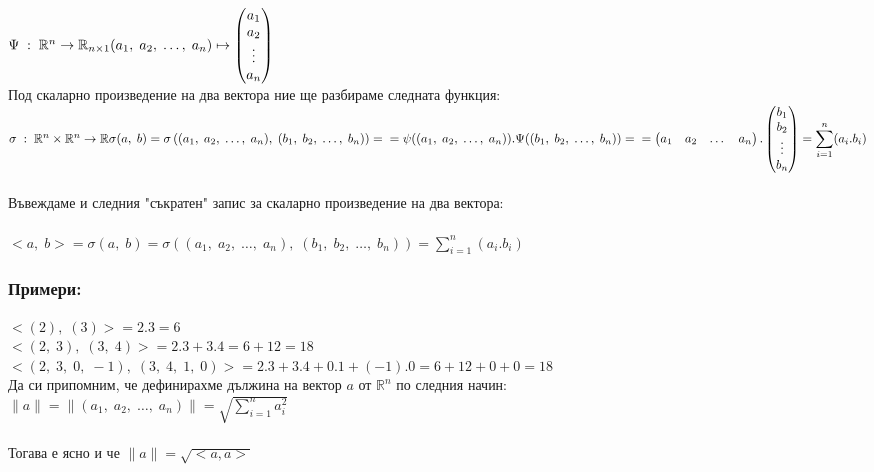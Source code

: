 \documentclass[12pt]{article}
\newcommand{\R}{\mathbb{R}}
\begin{document}
$\Psi \; : \; \R^n \to \R_{n \times 1} \\
(a_1, \; a_2, \; \dots, \; a_n) \mapsto \begin{pmatrix}
    a_1 \\
    a_2 \\
    \vdots \\
    a_n
\end{pmatrix} $ \\

Под скаларно произведение на два вектора ние ще разбираме следната функция: \\

$\sigma \; : \; \R^n \times \R^n \to \R \\
\sigma(a, \; b) = \sigma\left((a_1, \; a_2, \; \dots, \; a_n) , \; (b_1, \; b_2, \; \dots, \; b_n) \right) = \\
= \psi((a_1, \; a_2, \; \dots, \; a_n)).\Psi((b_1, \; b_2, \; \dots, \; b_n)) = \\\\
= \begin{pmatrix}
    a_1 & a_2 & \dots & a_n
\end{pmatrix}.\begin{pmatrix}
    b_1 \\
    b_2 \\
    \vdots \\
    b_n
\end{pmatrix} = \displaystyle\sum_{i = 1}^n (a_i.b_i)$ \\\\

Въвеждаме и следния "съкратен" \; запис за скаларно произведение на два вектора: \\\\
$<a, \; b> = \sigma(a, \; b) = \sigma\left((a_1, \; a_2, \; \dots, \; a_n) , \; (b_1, \; b_2, \; \dots, \; b_n) \right) = \displaystyle\sum_{i = 1}^n (a_i.b_i)$

\subsubsection*{Примери:}

$<(2), \; (3)> = 2.3 = 6$ \\

$<(2, \; 3), \; (3, \; 4)> = 2.3 + 3.4 = 6 + 12 = 18$ \\

$<(2, \; 3, \; 0, \; -1), \; (3, \; 4, \; 1, \; 0)> = 2.3 + 3.4 + 0.1 + (-1).0 = 6 + 12 + 0 + 0 = 18$ \\

Да си припомним, че дефинирахме дължина на вектор $a$ от $\R^n$ по следния начин: \\

$\|a\| = \|(a_1, \; a_2, \; \dots, \; a_n)\| = \displaystyle\sqrt{\displaystyle\sum_{i = 1}^n a_i^2}$ \\\\

Тогава е ясно и че $\|a\| = \sqrt{<a, a>}$
\end{document}
